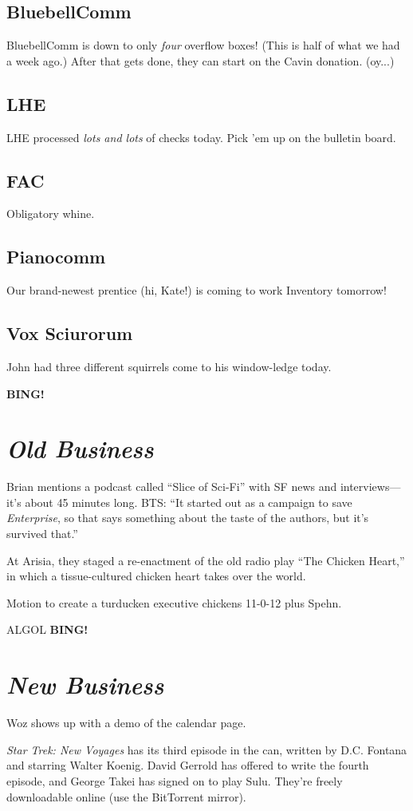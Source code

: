 \documentclass[10pt]{article}
\newcommand{\bing}{{\bf BING!} }
\newcommand{\goto}[1]{\bing \vskip 12pt \section*{{\em{#1}}}}
\newcommand{\ps}{ plus Spehn\xspace}
\begin{document}
\subsection*{BluebellComm}
BluebellComm is down to only \emph{four} overflow boxes!  (This is half of what we had a week ago.)
After that gets done, they can start on the Cavin donation.  (oy...)

\subsection*{LHE}
LHE processed \emph{lots and lots} of checks today.  Pick 'em up on the bulletin board.

\subsection*{FAC}
Obligatory whine.

\subsection*{Pianocomm}
Our brand-newest prentice (hi, Kate!) is coming to work Inventory tomorrow!


\subsection*{Vox Sciurorum}
John had three different squirrels come to his window-ledge today.

\goto{Old Business}
Brian mentions a podcast called ``Slice of Sci-Fi'' with SF news and interviews---it's about 
45 minutes long.  BTS: ``It started out as a campaign to save \emph{Enterprise}, so that says 
something about the taste of the authors, but it's survived that.''

At Arisia, they staged a re-enactment of the old radio play ``The Chicken Heart,'' in which a 
tissue-cultured chicken heart takes over the world.

Motion to create a turducken executive chickens 11-0-12\ps.

ALGOL
\goto{New Business}

Woz shows up with a demo of the calendar page.  %

\emph{Star Trek: New Voyages} has its third episode in the can, written by D.C. Fontana and 
starring Walter Koenig.  David Gerrold has offered to write the fourth episode, and George Takei has
signed on to play Sulu.  They're freely downloadable online (use the BitTorrent mirror).
\end{document}
